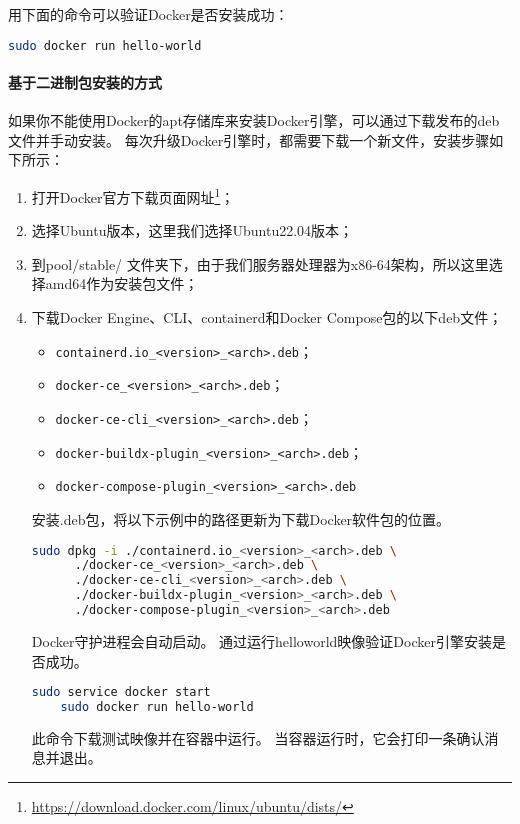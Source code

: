 \documentclass[lang=cn,a4paper,newtx]{elegantpaper}
\begin{document}
用下面的命令可以验证Docker是否安装成功：
\begin{lstlisting}[language=bash]
  sudo docker run hello-world
\end{lstlisting}

\paragraph{基于二进制包安装的方式}
如果你不能使用Docker的apt存储库来安装Docker引擎，可以通过下载发布的deb文件并手动安装。
每次升级Docker引擎时，都需要下载一个新文件，安装步骤如下所示：
\begin{enumerate}[label=(\arabic*). ]
  \item 打开Docker官方下载页面网址\footnote{\url{https://download.docker.com/linux/ubuntu/dists/}}；
  \item 选择Ubuntu版本，这里我们选择Ubuntu22.04版本；
  \item 到pool/stable/ 文件夹下，由于我们服务器处理器为x86-64架构，所以这里选择amd64作为安装包文件；
  \item 下载Docker Engine、CLI、containerd和Docker Compose包的以下deb文件；
  \begin{itemize}
    \item \verb|containerd.io_<version>_<arch>.deb|；
    \item \verb|docker-ce_<version>_<arch>.deb|；
    \item \verb|docker-ce-cli_<version>_<arch>.deb|；
    \item \verb|docker-buildx-plugin_<version>_<arch>.deb|；
    \item \verb|docker-compose-plugin_<version>_<arch>.deb|
  \end{itemize}
  安装.deb包，将以下示例中的路径更新为下载Docker软件包的位置。
  \begin{lstlisting}[language=bash]
    sudo dpkg -i ./containerd.io_<version>_<arch>.deb \
      ./docker-ce_<version>_<arch>.deb \
      ./docker-ce-cli_<version>_<arch>.deb \
      ./docker-buildx-plugin_<version>_<arch>.deb \
      ./docker-compose-plugin_<version>_<arch>.deb
  \end{lstlisting}
  Docker守护进程会自动启动。
  通过运行helloworld映像验证Docker引擎安装是否成功。
  \begin{lstlisting}[language=bash]
    sudo service docker start
    sudo docker run hello-world
  \end{lstlisting}
  此命令下载测试映像并在容器中运行。
  当容器运行时，它会打印一条确认消息并退出。
\end{enumerate}
\end{document}
